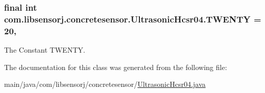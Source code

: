 \subsubsection[{T\+W\+E\+N\+T\+Y}]{\setlength{\rightskip}{0pt plus 5cm}final int com.\+libsensorj.\+concretesensor.\+Ultrasonic\+Hcsr04.\+T\+W\+E\+N\+T\+Y = 20\hspace{0.3cm}{\ttfamily [static]}, {\ttfamily [private]}}\label{classcom_1_1libsensorj_1_1concretesensor_1_1UltrasonicHcsr04_aa04a319fc4ef2ccf8de8a70bf27da2da}
The Constant T\+W\+E\+N\+T\+Y. 

The documentation for this class was generated from the following file\+:\begin{DoxyCompactItemize}
\item 
main/java/com/libsensorj/concretesensor/\hyperlink{UltrasonicHcsr04_8java}{Ultrasonic\+Hcsr04.\+java}\end{DoxyCompactItemize}

